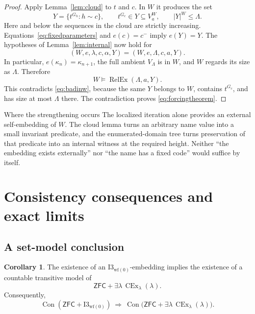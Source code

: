 \documentclass[11pt,letterpaper]{article}
\theoremstyle{definition}
\newtheorem{corollary}[definition]{Corollary}
\newcommand{\ZFC}{\mathsf{ZFC}}
\newcommand{\CEx}{\operatorname{CEx}}
\newcommand{\Con}{\operatorname{Con}}
\newcommand{\Iwf}{\mathrm{I3}_{\mathrm{wf}(0)}}
\newcommand{\RelEx}{\operatorname{RelEx}}
\begin{document}
\begin{proof}
Apply Lemma~\ref{lem:cloud} to $t$ and $c$. In $W$ it produces the set
\[
 Y=\{t^{G_h}:h\sim c\},
 \qquad t^{G_c}\in Y\subseteq V_a^W,\qquad |Y|^W\leq\Lambda.
\]
Here and below the sequences in the cloud are strictly increasing.
Equations~\eqref{eq:fixedparameters} and $e(c)=c^-$ imply $e(Y)=Y$.
The hypotheses of Lemma~\ref{lem:internal} now hold for
\[
 (W,e,\lambda,c,\alpha,Y)=(W,e,\Lambda,c,a,Y).
\]
In particular, $e(\kappa_n)=\kappa_{n+1}$, the full ambient
$V_\Lambda$ is in $W$, and $W$ regards its size as $\Lambda$.
Therefore
\[
 W\models\RelEx(\Lambda,a,Y).
\]
This contradicts \eqref{eq:badinw}, because the same $Y$ belongs to $W$,
contains $t^{G_c}$, and has size at most $\Lambda$ there.
The contradiction proves \eqref{eq:forcingtheorem}.
\end{proof}

\begin{assessment}{Where the strengthening occurs}
The localized iteration alone provides an external self-embedding of
$W$. The cloud lemma turns an arbitrary name value into a small invariant
predicate, and the enumerated-domain tree turns preservation of that
predicate into an internal witness at the required height. Neither
``the embedding exists externally'' nor ``the name has a fixed code''
would suffice by itself.
\end{assessment}

\section{Consistency consequences and exact limits}\label{sec:consequences}

\subsection{A set-model conclusion}

\begin{corollary}\label{cor:transitive}
The existence of an $\Iwf$-embedding implies the existence of a countable
transitive model of
\[
 \ZFC+\exists\lambda\,\CEx_\lambda(\lambda).
\]
Consequently,
\[
 \Con(\ZFC+\Iwf)\ \Longrightarrow\
 \Con\bigl(\ZFC+\exists\lambda\,\CEx_\lambda(\lambda)\bigr).
\]
\end{corollary}
\end{document}
